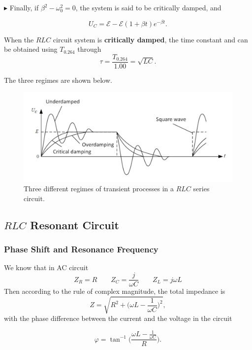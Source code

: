 \documentclass{article}
\begin{document}
$\blacktriangleright$ Finally, if $\beta^2 - \omega_0^2 = 0$, the system is said to be critically damped, and

$$U_C = \mathcal{E} - \mathcal{E}(1+\beta t)e^{-\beta t}.$$

When the $RLC$ circuit system is \textbf{critically damped}, the time constant and can be obtained using $T_{0.264}$ through
\begin{equation}
    \tau = \frac{T_{0.264}}{1.00} = \sqrt{LC}.
    \label{eq:ThalfRLC}
\end{equation}

The three regimes are shown below.
\begin{figure}[H]
\centering
\includegraphics[scale=0.5]{3damp}
\caption{Three different regimes of transient processes in a $RLC$ series circuit.}
\end{figure}

\subsection{$RLC$ Resonant Circuit}

\subsubsection{Phase Shift and Resonance Frequency}
We know that in AC circuit
$$
Z_R = R\hspace{2em}Z_C = \frac{j}{\omega C}\hspace{2em}Z_L = j\omega L
$$
Then according to the rule of complex magnitude, the total impedance is
\begin{equation*}\label{EqZ}
    Z = \sqrt{R^2 + \bigg(\omega L - \frac{1}{\omega C}\bigg)^2},
\end{equation*}
with the phase difference between the current and the voltage in the circuit

\begin{equation}
    \varphi = \tan^{-1}\bigg(\frac{\omega L - \frac{1}{\omega C}}{R}\bigg).
    \label{eq:phitheo}
\end{equation}
\end{document}

